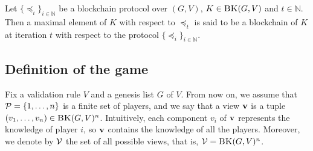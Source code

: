 %


\begin{mydef}
	Let $\{ \preceq_i\}_{i \in \mathbb{N}}$ be a blockchain protocol over $(G,V)$, $K \in \text{\sc BK}(G,V)$ and $t \in \mathbb{N}$. 
	Then a maximal element of $K$ with respect to $\preceq_t$ is said to be a blockchain of $K$ at iteration $t$ with respect to the protocol $\{ \preceq_i\}_{i \in \mathbb{N}}$.
\end{mydef}




\subsection{Definition of the game}
Fix a validation rule $V$ and a genesis list $G$ of $V$. From now on, we assume that $\mathcal{P} = \{1, \ldots, n\}$ is a finite set of players, and we say that a view $\mathbf{v}$ is a tuple $(v_1, \ldots, v_n) \in \text{\sc BK}(G,V)^n$. Intuitively, each component $v_i$ of $\mathbf{v}$ represents the knowledge of player $i$, so $\mathbf{v}$ contains the knowledge of all the players. Moreover, we denote by $\mathcal{V}$ the set of all possible views, that is, $\mathcal{V} = \text{\sc BK}(G,V)^n$.




